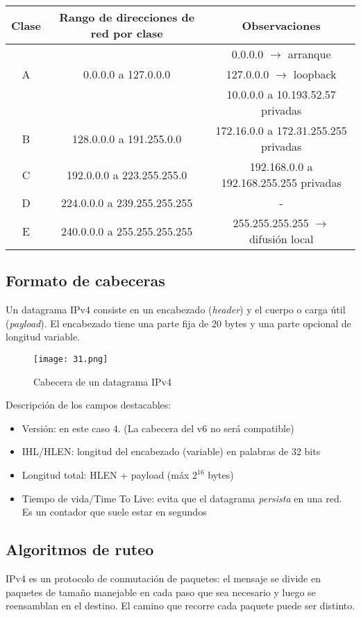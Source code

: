 \documentclass{book}
\begin{document}
	\begin{table}[H]
		\centering
		\begin{tabular}{|c|c|c|}
			\hline
			Clase&Rango de direcciones de red por clase&Observaciones\\
			\hline
			&&0.0.0.0 $\rightarrow$ arranque\\
			A&0.0.0.0 a 127.0.0.0&127.0.0.0 $\rightarrow$ loopback\\
			&&10.0.0.0 a 10.193.52.57 privadas\\
			\hline
			B&128.0.0.0 a 191.255.0.0&172.16.0.0 a 172.31.255.255 privadas\\
			\hline
			C&192.0.0.0 a 223.255.255.0&192.168.0.0 a 192.168.255.255 privadas\\
			\hline
			D&224.0.0.0 a 239.255.255.255&-\\
			\hline
			E&240.0.0.0 a 255.255.255.255&255.255.255.255 $\rightarrow$ difusión local\\
			\hline
		\end{tabular}
	\end{table}
	
	\subsection{Formato de cabeceras}
	Un datagrama IPv4 consiste en un encabezado (\textit{header}) y el cuerpo o carga útil (\textit{payload}). El encabezado tiene una parte fija de 20 bytes y una parte opcional de longitud variable.
	
	\begin{figure}[H]
		\centering
		\texttt{[image: 31.png]}
		\caption{Cabecera de un datagrama IPv4}
	\end{figure}
	
	\pagebreak
	Descripción de los campos destacables:
	
	\begin{itemize}
		\item Versión: en este caso 4. (La cabecera del v6 no será compatible)
		\item IHL/HLEN: longitud del encabezado (variable) en palabras de 32 bits
		\item Longitud total: HLEN + payload (máx $2^{16}$ bytes)
		\item Tiempo de vida/Time To Live: evita que el datagrama \textit{persista} en una red. Es un contador que suele estar en segundos
	\end{itemize}
	
	\subsection{Algoritmos de ruteo}
	IPv4 es un protocolo de conmutación de paquetes: el mensaje se divide en paquetes de tamaño manejable en cada paso que sea necesario y luego se reensamblan en el destino. El camino que recorre cada paquete puede ser distinto.
	
\end{document}
